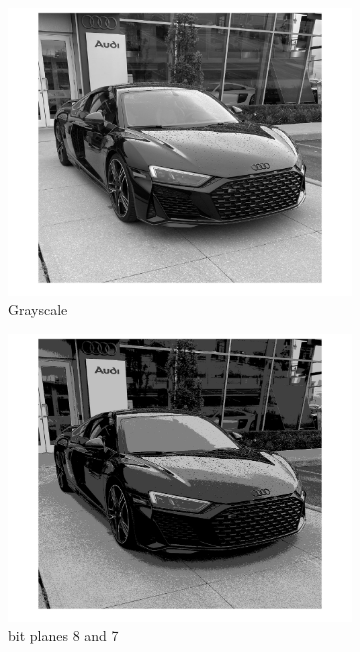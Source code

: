 \documentclass[conference]{IEEEtran}
\begin{document}
\begin{figure}[h!]
\centering
\begin{subfigure}[b]{0.3\linewidth}
\includegraphics[width=\linewidth]{images/img1.jpg}
\caption{Grayscale}
\end{subfigure}
\begin{subfigure}[b]{0.3\linewidth}
\includegraphics[width=\linewidth]{images/img12.jpg}
\caption{bit planes 8 and 7}
\end{subfigure}
\begin{subfigure}[b]{0.3\linewidth}

\end{subfigure}
\end{figure}
\end{document}
